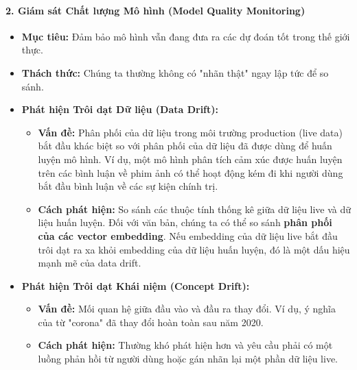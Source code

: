 \paragraph{2. Giám sát Chất lượng Mô hình (Model Quality Monitoring)}
\begin{itemize}
    \item \textbf{Mục tiêu:} Đảm bảo mô hình vẫn đang đưa ra các dự đoán tốt trong thế giới thực.
    \item \textbf{Thách thức:} Chúng ta thường không có "nhãn thật" ngay lập tức để so sánh.
    \item \textbf{Phát hiện Trôi dạt Dữ liệu (Data Drift):}
        \begin{itemize}
            \item \textbf{Vấn đề:} Phân phối của dữ liệu trong môi trường production (live data) bắt đầu khác biệt so với phân phối của dữ liệu đã được dùng để huấn luyện mô hình. Ví dụ, một mô hình phân tích cảm xúc được huấn luyện trên các bình luận về phim ảnh có thể hoạt động kém đi khi người dùng bắt đầu bình luận về các sự kiện chính trị.
            \item \textbf{Cách phát hiện:} So sánh các thuộc tính thống kê giữa dữ liệu live và dữ liệu huấn luyện. Đối với văn bản, chúng ta có thể so sánh \textbf{phân phối của các vector embedding}. Nếu embedding của dữ liệu live bắt đầu trôi dạt ra xa khỏi embedding của dữ liệu huấn luyện, đó là một dấu hiệu mạnh mẽ của data drift.
        \end{itemize}
    \item \textbf{Phát hiện Trôi dạt Khái niệm (Concept Drift):}
        \begin{itemize}
            \item \textbf{Vấn đề:} Mối quan hệ giữa đầu vào và đầu ra thay đổi. Ví dụ, ý nghĩa của từ "corona" đã thay đổi hoàn toàn sau năm 2020.
            \item \textbf{Cách phát hiện:} Thường khó phát hiện hơn và yêu cầu phải có một luồng phản hồi từ người dùng hoặc gán nhãn lại một phần dữ liệu live.
        \end{itemize}
\end{itemize}

